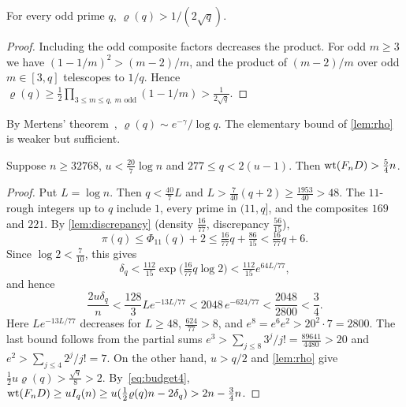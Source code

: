 \begin{lemma}\label{lem:rho}
For every odd prime $q$, $\varrho(q)>1/(2\sqrt q)$.
\end{lemma}

\begin{proof}
Including the odd composite factors decreases the product. For odd $m\ge3$ we have $(1-1/m)^2>(m-2)/m$, and the product of $(m-2)/m$ over odd $m\in[3,q]$ telescopes to $1/q$. Hence $\varrho(q)\ge\frac12\prod_{3\le m\le q,\ m\text{ odd}}(1-1/m)>\frac1{2\sqrt q}$.
\end{proof}

By Mertens' theorem~\cite{Mertens}, $\varrho(q)\sim e^{-\gamma}/\log q$. The elementary bound of \cref{lem:rho} is weaker but sufficient.

\begin{lemma}\label{lem:large-q}
Suppose $n\ge32768$, $u<\frac{20}7\log n$ and $277\le q<2(u-1)$. Then $\operatorname{wt}(F_nD)>\frac54n$.
\end{lemma}

\begin{proof}
Put $L=\log n$. Then $q<\frac{40}7L$ and $L>\frac7{40}(q+2)\ge\frac{1953}{40}>48$. The $11$-rough integers up to $q$ include $1$, every prime in $(11,q]$, and the composites $169$ and $221$. By \cref{lem:discrepancy} (density $\frac{16}{77}$, discrepancy $\frac{56}{15}$),
\[
 \pi(q)\le\Phi_{11}(q)+2\le\tfrac{16}{77}q+\tfrac{86}{15}<\tfrac{16}{77}q+6 .
\]
Since $\log2<\frac7{10}$, this gives
\[
 \delta_q<\tfrac{112}{15}\exp\bigl(\tfrac{16}{77}q\log2\bigr)<\tfrac{112}{15}e^{64L/77},
\]
and hence
\[
 \frac{2u\delta_q}{n}<\frac{128}3Le^{-13L/77}<2048\,e^{-624/77}<\frac{2048}{2800}<\frac34 .
\]
Here $Le^{-13L/77}$ decreases for $L\ge48$, $\frac{624}{77}>8$, and $e^8=e^6e^2>20^2\cdot7=2800$. The last bound follows from the partial sums $e^3>\sum_{j\le8}3^j/j!=\frac{89641}{4480}>20$ and $e^2>\sum_{j\le4}2^j/j!=7$. On the other hand, $u>q/2$ and \cref{lem:rho} give $\frac12u\varrho(q)>\frac{\sqrt q}8>2$. By~\eqref{eq:budget4}, $\operatorname{wt}(F_nD)\ge uI_q(n)\ge u(\frac12\varrho(q)n-2\delta_q)>2n-\frac34n$.
\end{proof}

